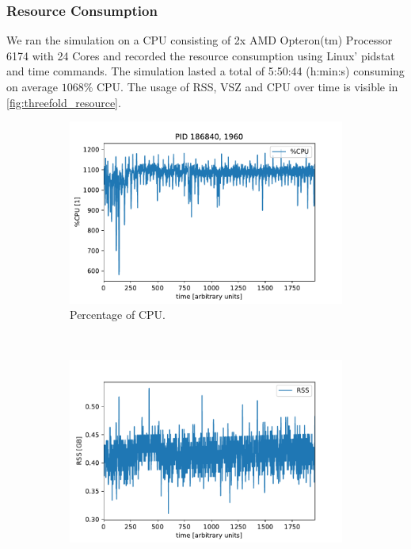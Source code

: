 \documentclass[11pt, a4paper, oneside]{article}
\begin{document}
\subsubsection{Resource Consumption}
We ran the simulation on a CPU consisting of 2x AMD Opteron(tm) Processor 6174 with 24 Cores and recorded the resource consumption using Linux' pidstat and time commands. The simulation lasted a total of 5:50:44 (h:min:s) consuming on average $1068 \%$ CPU. The usage of RSS, VSZ and CPU over time is visible in \cref{fig:threefold_resource}.
\begin{figure}[h]
  \begin{subfigure}[b]{0.5 \textwidth}
    \includegraphics[width = \textwidth]{graphics/threefold_morse/threefold_perCPU.pdf}
    \caption{Percentage of CPU.}
  \end{subfigure}
  ~
  \begin{subfigure}[b]{0.5 \textwidth}
    \includegraphics[width = \textwidth]{graphics/threefold_morse/threefold_RSS.pdf}

\end{subfigure}
\end{figure}
\end{document}
